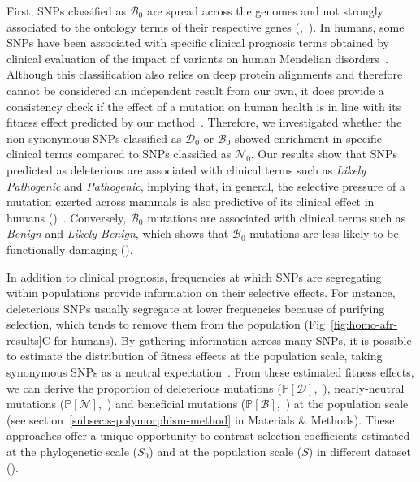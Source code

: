 \documentclass[10pt,letterpaper]{article}
\newcommand{\proba}{\mathbb{P}}
\newcommand{\Sphy}{S_{0}}
\newcommand{\SphyDel}{\mathcal{D}_0}
\newcommand{\SphyNeu}{\mathcal{N}_0}
\newcommand{\SphyBen}{\mathcal{B}_0}
\newcommand{\Spop}{S}
\newcommand{\SpopDel}{\mathcal{D}}
\newcommand{\SpopNeu}{\mathcal{N}}
\newcommand{\SpopBen}{\mathcal{B}}
\newcommand{\ProbaPopDel}{\proba [ \SpopDel]}
\newcommand{\ProbaPopNeu}{\proba [ \SpopNeu ]}
\newcommand{\ProbaPopBen}{\proba [ \SpopBen ]}
\begin{document}
First, SNPs classified as $\SphyBen$ are spread across the genomes and not strongly associated to the ontology terms of their respective genes (,~).
In humans, some SNPs have been associated with specific clinical prognosis terms obtained by clinical evaluation of the impact of variants on human Mendelian disorders~\cite{landrum_clinvar_2018}.
Although this classification also relies on deep protein alignments and therefore cannot be considered an independent result from our own, it does provide a consistency check if the effect of a mutation on human health is in line with its fitness effect predicted by our method~\cite{grimm_evaluation_2015}.
Therefore, we investigated whether the non-synonymous SNPs classified as $\SphyDel$ or $\SphyBen$ showed enrichment in specific clinical terms compared to SNPs classified as $\SphyNeu$.
Our results show that SNPs predicted as deleterious are associated with clinical terms such as \textit{Likely Pathogenic} and \textit{Pathogenic}, implying that, in general, the selective pressure of a mutation exerted across mammals is also predictive of its clinical effect in humans ()~\cite{sullivan_leveraging_2023}.
Conversely, $\SphyBen$ mutations are associated with clinical terms such as \textit{Benign} and \textit{Likely Benign}, which shows that $\SphyBen$ mutations are less likely to be functionally damaging ().

In addition to clinical prognosis, frequencies at which SNPs are segregating within populations provide information on their selective effects.
For instance, deleterious SNPs usually segregate at lower frequencies because of purifying selection, which tends to remove them from the population (Fig~\ref{fig:homo-afr-results}C for humans).
By gathering information across many SNPs, it is possible to estimate the distribution of fitness effects at the population scale, taking synonymous SNPs as a neutral expectation~\cite{eyre-walker_distribution_2006, eyre-walker_estimating_2009, galtier_adaptive_2016, tataru_inference_2017}.
From these estimated fitness effects, we can derive the proportion of deleterious mutations ($\ProbaPopDel$,~), nearly-neutral mutations ($\ProbaPopNeu$,~) and beneficial mutations ($\ProbaPopBen$,~) at the population scale (see section~\ref{subsec:s-polymorphism-method} in Materials \& Methods).
These approaches offer a unique opportunity to contrast selection coefficients estimated at the phylogenetic scale ($\Sphy$) and at the population scale ($\Spop$) in different dataset ().
\end{document}
